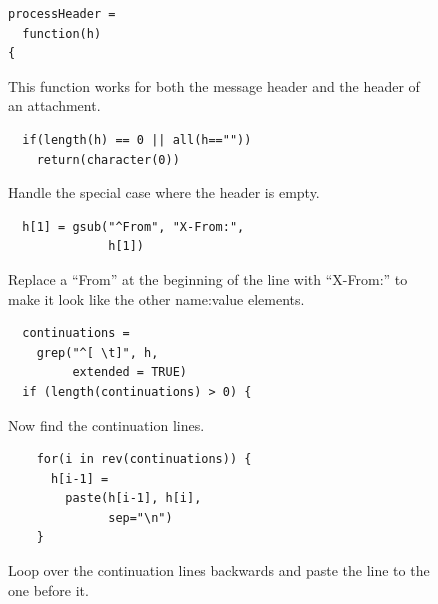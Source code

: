 \begin{figure}
\begin{minipage}{15cm}

\begin{minipage}[t]{9cm}
\begin{verbatim}
processHeader = 
  function(h)
{
\end{verbatim}
\end{minipage}
\begin{minipage}[t]{6cm}
{\footnotesize{
  This function works for both the message header and 
  the header of an attachment.
  \\
}}
\end{minipage}

\begin{minipage}[t]{9cm}
\begin{verbatim}
  if(length(h) == 0 || all(h==""))
    return(character(0))
\end{verbatim}
\end{minipage}
\begin{minipage}[t]{6cm}
{\footnotesize{
Handle the special case where the header is empty.
\\
}}
\end{minipage}

\begin{minipage}[t]{9cm}
\begin{verbatim}
  h[1] = gsub("^From", "X-From:", 
              h[1])
\end{verbatim}
\end{minipage}
\begin{minipage}[t]{6cm}
{\footnotesize{
 Replace a ``From'' at the beginning of the 
 line with ``X-From:'' to make it look like the other 
 name:value elements.
\\
}}
\end{minipage}

\begin{minipage}[t]{9cm}
\begin{verbatim}
  continuations = 
    grep("^[ \t]", h, 
         extended = TRUE)
  if (length(continuations) > 0) {
\end{verbatim}
\end{minipage}
\begin{minipage}[t]{6cm}
{\footnotesize{
Now find the continuation lines.
}}
\\
\end{minipage}

\begin{minipage}[t]{9cm}
\begin{verbatim}
    for(i in rev(continuations)) {
      h[i-1] = 
        paste(h[i-1], h[i], 
              sep="\n")
    }
\end{verbatim}
\end{minipage}
\begin{minipage}[t]{6cm}
{\footnotesize{
Loop over the continuation lines backwards and paste
the line to the one before it.
}}
\\
\end{minipage}


\end{minipage}
\end{figure}
